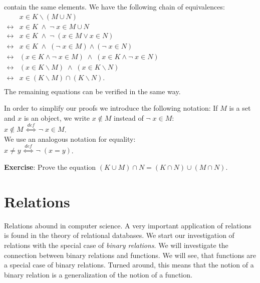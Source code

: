 contain the same elements.
We have the following chain of equivalences: \\[0.3cm]
\hspace*{1.3cm} $
\begin{array}{ll}
                & x \in K \backslash (M \cup N)        \\[0.1cm]
\leftrightarrow & x \in K \;\wedge\; \neg\; x \in M \cup N \\[0.1cm]
\leftrightarrow & x \in K \;\wedge\; \neg\; (x \in M \vee x \in N) \\[0.1cm]
\leftrightarrow & x \in K \;\wedge\;  (\neg\; x \in M) \wedge (\neg\; x \in N) \\[0.1cm]
\leftrightarrow & (x \in K \wedge \neg\;x \in M) \;\wedge\; (x \in K \wedge \neg\;x \in N) \\[0.1cm]
\leftrightarrow & (x \in K \backslash M) \;\wedge\; (x \in K \backslash N) \\[0.1cm]
\leftrightarrow & x \in (K \backslash M) \cap (K \backslash N). \\[0.1cm]
\end{array}$ \\[0.3cm]
The remaining equations can be verified in the same way.


\noindent
In order to simplify our proofs we introduce the following notation:
If $M$ is a set and $x$ is an object, we write $x \notin M$  instead of
 $\neg\; x \in M$: \\[0.2cm]
\hspace*{1.3cm} $x \notin M \;\stackrel{de\!f}{\Longleftrightarrow}\; \neg\; x \in M$.
\\[0.2cm]
We use an analogous notation for equality:
\\[0.2cm]
\hspace*{1.3cm} 
$x \not= y \;\stackrel{de\!f}{\Longleftrightarrow}\; \neg\; (x = y)$.
\vspace{0.2cm}

\noindent
\textbf{Exercise}:  Prove the equation $(K \cup M) \cap N = (K \cap N) \cup (M \cap N)$.
\pagebreak

\section{Relations}
Relations abound in computer science.  A very important application of 
relations is found in the theory of relational databases.  We start our investigation of
relations with the special case of \emph{binary relations}.  We will investigate the
connection
between binary relations and functions.  We will see, that functions are 
a special case of binary relations.  Turned around, this means that
the notion of a binary relation is a generalization of the notion of a function.

